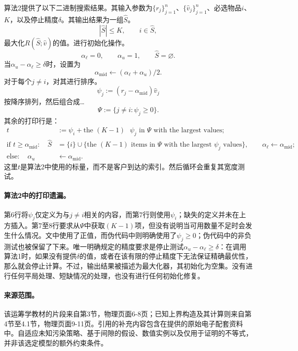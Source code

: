 \documentclass{article}
\begin{document}
算法2提供了以下二进制搜索结果。其输入参数为$\{r_j\}_{j=1}^{n}$、$\{\widehat v_j\}_{j=1}^{n}$、必选物品$i$、$K$，以及停止精度$\delta$。其输出结果为一组$\widehat S$。
\[
|\widehat S|\le K,\qquad i\in\widehat S,
\]
最大化$R(\widehat S;\widehat v)$的值。进行初始化操作。
\[
\alpha_\ell=0,\qquad \alpha_u=1,\qquad \widehat S=\varnothing.
\]
当$\alpha_u-\alpha_\ell\ge\delta$时，设置为
\[
\alpha_{\mathrm{mid}}\leftarrow(\alpha_\ell+\alpha_u)/2.
\]
对于每个$j\ne i$，对其进行排序。
\[
\psi_j:=(r_j-\alpha_{\mathrm{mid}})\widehat v_j
\]
按降序排列，然后组合成…
\[
\Psi:=\{j\ne i:\psi_j\ge0\}.
\]
其余的打印行是：
\[
\begin{aligned}
t&:=\psi_i+\text{the $(K-1)$ $\psi_j$ in $\Psi$ with the largest values};\\
\text{if }t\ge\alpha_{\mathrm{mid}}:\quad
\widehat S&=\{i\}\cup
\{\text{the $(K-1)$ items in $\Psi$ with the largest $\psi_j$ values}\},
\qquad \alpha_\ell\leftarrow\alpha_{\mathrm{mid}};\\
\text{else}:\quad \alpha_u&\leftarrow\alpha_{\mathrm{mid}}.
\end{aligned}
\]
这里$t$是算法2中使用的标量，而不是客户到达的索引。然后循环会重复其宽度测试。

\paragraph{算法2中的打印遗漏。}
第6行将$\psi_j$仅定义为与$j\ne i$相关的内容，而第7行则使用$\psi_i$；缺失的定义并未在上方插入。第7至8行要求从$\Psi$中获取$(K-1)$项，但没有说明当可用数量不足时会发生什么情况。文中使用了正值，而伪代码中则明确使用了$\psi_j\ge0$；伪代码中的非负测试也被保留了下来。唯一明确规定的精度要求是停止测试$\alpha_u-\alpha_\ell\ge\delta$：在调用算法1时，如果没有提供$\delta$的值，或者在该有限的停止精度下无法保证精确最优性，那么就会停止计算。不过，输出结果被描述为最大化器，其初始化为空集。没有进行任何平局处理、短缺情况的处理，也没有进行任何初始化修复。

\paragraph{来源范围。}
该运筹学教材的片段来自第3节，物理页面6-8页；已知上界构造及其计算则来自第4节至4.1节，物理页面9-11页。引用的补充内容包含在提供的原始电子配套资料中。自适应未知污染策略、基于间隙的假设、数值实例以及仅用于证明的不等式，并非该选定模型的额外约束条件。
\end{document}
